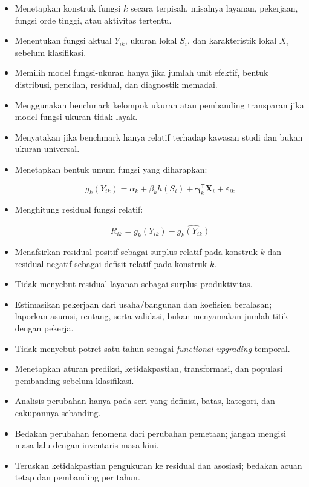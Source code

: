 \documentclass[
  indonesian,
  11pt,
]{article}
\begin{document}
\begin{itemize}
\item[$\square$]
  Menetapkan konstruk fungsi \(k\) secara terpisah, misalnya layanan,
  pekerjaan, fungsi orde tinggi, atau aktivitas tertentu.
\item[$\square$]
  Menentukan fungsi aktual \(Y_{ik}\), ukuran lokal \(S_i\), dan
  karakteristik lokal \(X_i\) sebelum klasifikasi.
\item[$\square$]
  Memilih model fungsi-ukuran hanya jika jumlah unit efektif, bentuk
  distribusi, pencilan, residual, dan diagnostik memadai.
\item[$\square$]
  Menggunakan benchmark kelompok ukuran atau pembanding transparan jika
  model fungsi-ukuran tidak layak.
\item[$\square$]
  Menyatakan jika benchmark hanya relatif terhadap kawasan studi dan
  bukan ukuran universal.
\item[$\square$]
  Menetapkan bentuk umum fungsi yang diharapkan:

  \[
  g_k(Y_{ik}) = \alpha_k + \beta_k h(S_i) + \boldsymbol{\gamma}_k^{\mathsf T}\mathbf{X}_i + \varepsilon_{ik}
  \]
\item[$\square$]
  Menghitung residual fungsi relatif:

  \[
  R_{ik}=g_k(Y_{ik})-\widehat{g_k(Y_{ik})}
  \]
\item[$\square$]
  Menafsirkan residual positif sebagai surplus relatif pada konstruk
  \(k\) dan residual negatif sebagai defisit relatif pada konstruk
  \(k\).
\item[$\square$]
  Tidak menyebut residual layanan sebagai surplus produktivitas.
\item[$\square$]
  Estimasikan pekerjaan dari usaha/bangunan dan koefisien beralasan;
  laporkan asumsi, rentang, serta validasi, bukan menyamakan jumlah
  titik dengan pekerja.
\item[$\square$]
  Tidak menyebut potret satu tahun sebagai \emph{functional upgrading}
  temporal.
\item[$\square$]
  Menetapkan aturan prediksi, ketidakpastian, transformasi, dan populasi
  pembanding sebelum klasifikasi.
\item[$\square$]
  Analisis perubahan hanya pada seri yang definisi, batas, kategori, dan
  cakupannya sebanding.
\item[$\square$]
  Bedakan perubahan fenomena dari perubahan pemetaan; jangan mengisi
  masa lalu dengan inventaris masa kini.
\item[$\square$]
  Teruskan ketidakpastian pengukuran ke residual dan asosiasi; bedakan
  acuan tetap dan pembanding per tahun.
\end{itemize}
\end{document}
